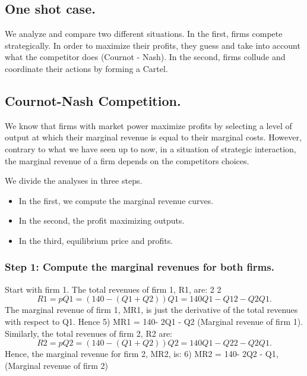 \documentclass[]{article}
\begin{document}
\subsection{One shot case.}
We analyze and compare two different situations. In the first, firms compete
strategically. In order to maximize their profits, they guess and take into account what the
competitor does (Cournot - Nash). In the second, firms collude and coordinate their
actions by forming a Cartel.

\subsection{Cournot-Nash Competition.}
We know that firms with market power maximize profits by selecting a level of
output at which their marginal revenue is equal to their marginal costs. However, contrary
to what we have seen up to now, in a situation of strategic interaction, the marginal
revenue of a firm depends on the competitors choices.

We divide the analyses in three steps. 
\begin{itemize}
    \item In the first, we compute the marginal revenue
curves.
\item In the second, the profit maximizing outputs. 
\item In the third, equilibrium price and
profits.
\end{itemize}
\subsubsection{Step 1: Compute the marginal revenues for both firms.}
Start with firm 1. The total revenues of firm 1, R1, are:
2
2
\[R1= pQ1 = (140-(Q1+Q2))Q1 = 140 Q1 - Q1
2 - Q2Q1.\]
The marginal revenue of firm 1, MR1, is just the derivative of the total revenues with
respect to Q1. Hence
5) MR1 = 140- 2Q1 - Q2 (Marginal revenue of firm 1).
Similarly, the total revenues of firm 2, R2 are:
\[R2= pQ2 = (140-(Q1+Q2))Q2 = 140 Q1-Q2
2
-Q2Q1.\]
Hence, the marginal revenue for firm 2, MR2, is:
6) MR2 = 140- 2Q2 - Q1, (Marginal revenue of firm 2)
\end{document}
